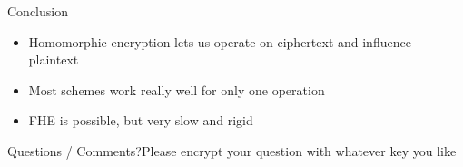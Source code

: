 \documentclass[12pt]{beamer}
\begin{document}
\begin{frame}{Conclusion}
	\begin{itemize}
		\item Homomorphic encryption lets us operate on ciphertext and influence
			plaintext
		\item Most schemes work really well for only one operation
		\item FHE is possible, but very slow and rigid
	\end{itemize}
\end{frame}


\begin{frame}{Questions / Comments?}{Please encrypt your question with whatever
	key you like}
\end{frame}
\end{document}
